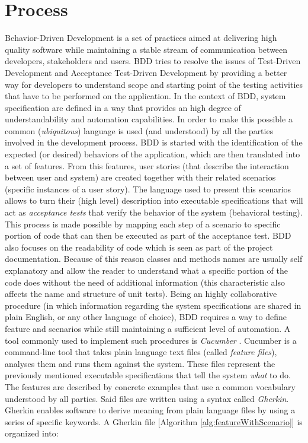 \section{Process} 

Behavior-Driven Development \cite{BDD} is a set of practices aimed at delivering high quality software while maintaining a stable stream of communication between developers, stakeholders and users. BDD tries to resolve the issues of Test-Driven Development and Acceptance Test-Driven Development by providing a better way for developers to understand scope and starting point of the testing activities that have to be performed on the application.
In the context of BDD, system specification are defined in a way that provides an high degree of understandability and automation capabilities. In order to make this possible a common (\textit{ubiquitous}) language is used (and understood) by all the parties involved in the development process.
BDD is started with the identification of the expected (or desired) behaviors of the application, which are then translated into a set of features. From this features, user stories (that describe the interaction between user and system) are created together with their related scenarios (specific instances of a user story). The language used to present this scenarios allows to turn their (high level) description into executable specifications that will act as \textit{acceptance tests} that verify the behavior of the system (behavioral testing). This process is made possible by mapping each step of a scenario to specific portion of code that can then be executed as part of the acceptance test.
BDD also focuses on the readability of code which is seen as part of the project documentation. Because of this reason classes and methods names are usually self explanatory and allow the reader to understand what a specific portion of the code does without the need of additional information (this characteristic also affects the name and structure of unit tests).
Being an highly collaborative procedure (in which information regarding the system specifications are shared in plain English, or any other language of choice), BDD requires a way to define feature and scenarios while still maintaining a sufficient level of automation. A tool commonly used to implement such procedures is \textit{Cucumber} \cite{Cucumber}. Cucumber is a command-line tool that takes plain language text files (called \textit{feature files}), analyses them and runs them against the system. These files represent the previously mentioned executable specifications that tell the system \textit{what} to do. The features are described by concrete examples that use a common vocabulary understood by all parties. Said files are written using a syntax called \textit{Gherkin}. Gherkin enables software to derive meaning from plain language files by using a series of specific keywords. A Gherkin file [Algorithm \ref{alg:featureWithScenario}] is organized into:

